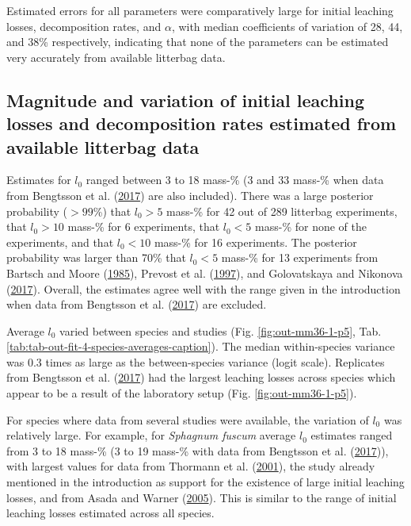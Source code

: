 \documentclass[
  12pt,
]{article}
\begin{document}
Estimated errors for all parameters were comparatively large for initial leaching losses, decomposition rates, and \(\alpha\), with median coefficients of variation of 28, 44, and 38\% respectively, indicating that none of the parameters can be estimated very accurately from available litterbag data.

\hypertarget{out-res-1}{%
\subsection{Magnitude and variation of initial leaching losses and decomposition rates estimated from available litterbag data}\label{out-res-1}}

Estimates for \(l_0\) ranged between 3 to 18 mass-\% (3 and 33 mass-\% when data from Bengtsson et al. (\protect\hyperlink{ref-Bengtsson.2017}{2017}) are also included). There was a large posterior probability (\(>99\)\%) that \(l_0>5\) mass-\% for 42 out of 289 litterbag experiments, that \(l_0>10\) mass-\% for 6 experiments, that \(l_0<5\) mass-\% for none of the experiments, and that \(l_0<10\) mass-\% for 16 experiments. The posterior probability was larger than 70\% that \(l_0<5\) mass-\% for 13 experiments from Bartsch and Moore (\protect\hyperlink{ref-Bartsch.1985}{1985}), Prevost et al. (\protect\hyperlink{ref-Prevost.1997}{1997}), and Golovatskaya and Nikonova (\protect\hyperlink{ref-Golovatskaya.2017}{2017}). Overall, the estimates agree well with the range given in the introduction when data from Bengtsson et al. (\protect\hyperlink{ref-Bengtsson.2017}{2017}) are excluded.

Average \(l_0\) varied between species and studies (Fig. \ref{fig:out-mm36-1-p5}, Tab. \ref{tab:tab-out-fit-4-species-averages-caption}). The median within-species variance was 0.3 times as large as the between-species variance (logit scale). Replicates from Bengtsson et al. (\protect\hyperlink{ref-Bengtsson.2017}{2017}) had the largest leaching losses across species which appear to be a result of the laboratory setup (Fig. \ref{fig:out-mm36-1-p5}).

For species where data from several studies were available, the variation of \(l_0\) was relatively large. For example, for \emph{Sphagnum fuscum} average \(l_0\) estimates ranged from 3 to 18 mass-\% (3 to 19 mass-\% with data from Bengtsson et al. (\protect\hyperlink{ref-Bengtsson.2017}{2017})), with largest values for data from Thormann et al. (\protect\hyperlink{ref-Thormann.2001}{2001}), the study already mentioned in the introduction as support for the existence of large initial leaching losses, and from Asada and Warner (\protect\hyperlink{ref-Asada.2005b}{2005}). This is similar to the range of initial leaching losses estimated across all species.
\end{document}
